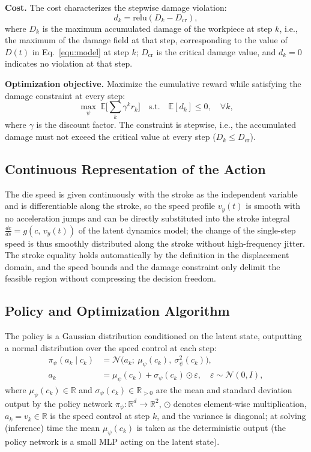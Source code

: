 \textbf{Cost.} The cost characterizes the stepwise damage violation:
\begin{equation}
d_k=\mathrm{relu}(D_k-D_{\text{cr}}),
\end{equation}
where $D_k$ is the maximum accumulated damage of the workpiece at step $k$, i.e., the maximum of the damage field at that step, corresponding to the value of $D(t)$ in Eq.~\ref{equ:model} at step $k$; $D_{\text{cr}}$ is the critical damage value, and $d_k=0$ indicates no violation at that step.

\textbf{Optimization objective.} Maximize the cumulative reward while satisfying the damage constraint at every step:
\begin{equation}
\max_{\psi}\ \mathbb{E}\Big[\sum_{k}\gamma^{k} r_k\Big]\quad \text{s.t.}\quad \mathbb{E}[d_k]\le 0,\quad \forall k,
\end{equation}
where $\gamma$ is the discount factor. The constraint is stepwise, i.e., the accumulated damage must not exceed the critical value at every step ($D_k\le D_{\text{cr}}$).

\subsection{Continuous Representation of the Action}
The die speed is given continuously with the stroke as the independent variable and is differentiable along the stroke, so the speed profile $v_y(t)$ is smooth with no acceleration jumps and can be directly substituted into the stroke integral $\frac{dc}{ds}=g(c,\,v_y(t))$ of the latent dynamics model; the change of the single-step speed is thus smoothly distributed along the stroke without high-frequency jitter. The stroke equality holds automatically by the definition in the displacement domain, and the speed bounds and the damage constraint only delimit the feasible region without compressing the decision freedom.

\subsection{Policy and Optimization Algorithm}
The policy is a Gaussian distribution conditioned on the latent state, outputting a normal distribution over the speed control at each step:
\begin{equation}
\begin{aligned}
\pi_{\psi}(a_k\mid c_k)&=\mathcal{N}\big(a_k;\ \mu_{\psi}(c_k),\ \sigma_{\psi}^{2}(c_k)\big),\\
a_k&=\mu_{\psi}(c_k)+\sigma_{\psi}(c_k)\odot\varepsilon,\quad \varepsilon\sim\mathcal{N}(0,I),
\end{aligned}
\end{equation}
where $\mu_{\psi}(c_k)\in\mathbb{R}$ and $\sigma_{\psi}(c_k)\in\mathbb{R}_{>0}$ are the mean and standard deviation output by the policy network $\pi_{\psi}:\mathbb{R}^{d}\to\mathbb{R}^{2}$, $\odot$ denotes element-wise multiplication, $a_k=v_k\in\mathbb{R}$ is the speed control at step $k$, and the variance is diagonal; at solving (inference) time the mean $\mu_{\psi}(c_k)$ is taken as the deterministic output (the policy network is a small MLP acting on the latent state).

